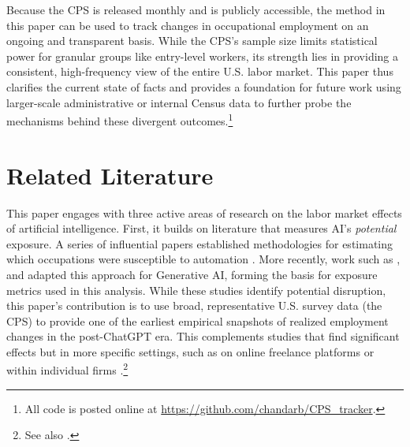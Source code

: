 \documentclass[12pt]{article}
\numberwithin{equation}{section}
\theoremstyle{theorem}\newcustomtheorem{theorem}{{\bf\sc Theorem}}
\theoremstyle{definition}\newcustomtheorem{assumption}{{\bf\sc Assumption}}
\theoremstyle{theorem} \newcustomtheorem{proposition}{{\bf\sc Proposition}}
\begin{document}
Because the CPS is released monthly and is publicly accessible, the method in this paper can be used to track changes in occupational employment on an ongoing and transparent basis. While the CPS's sample size limits statistical power for granular groups like entry-level workers, its strength lies in providing a consistent, high-frequency view of the entire U.S. labor market. This paper thus clarifies the current state of facts and provides a foundation for future work using larger-scale administrative or internal Census data to further probe the mechanisms behind these divergent outcomes.\footnote{All code is posted online at \url{https://github.com/chandarb/CPS_tracker}.} 

\section{Related Literature}

This paper engages with three active areas of research on the labor market effects of artificial intelligence. First, it builds on literature that measures AI's \emph{potential} exposure. A series of influential papers established methodologies for estimating which occupations were susceptible to automation \citep{frey_future_2017,brynjolfsson_what_2018,felten_method_2018, felten_occupational_2019,webb_impact_2019,felten_occupational_2021}. More recently, work such as \citet{eloundou_gpts_2023, felten_how_2023, gmyrek_generative_2023}, and \citet{gmyrek_generative_2025} adapted this approach for Generative AI, forming the basis for exposure metrics used in this analysis. While these studies identify potential disruption, this paper's contribution is to use broad, representative U.S. survey data (the CPS) to provide one of the earliest empirical snapshots of realized employment changes in the post-ChatGPT era. This complements studies that find significant effects but in more specific settings, such as on online freelance platforms \citep{hui_short-term_2023} or within individual firms \citep{brynjolfsson_generative_2025,dillon2025early}.\footnote{See also \citet{noy_experimental_2023,peng_impact_2023,dellacqua_navigating_2023}.}
\end{document}
